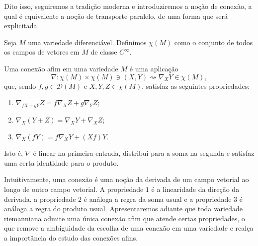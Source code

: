 Dito isso, seguiremos a tradição moderna e introduziremos a noção de conexão, a qual é equivalente a noção de transporte paralelo, de uma forma que será explicitada.
\begin{definition}
    \label{loc:2.1_:_def_1_:_conjunto_dos_campos_de_vetores}
    Seja $M$ uma variedade diferenciável. Definimos $\chi(M)$ como o conjunto de todos os campos de vetores em $M$ de classe $C^{\infty}$.
\end{definition}
\begin{definition}
    \label{loc:2.1_:_def_2_:_conexão_afim.definição}
    Uma conexão afim em uma variedade $M$ é uma aplicação
    \begin{equation*}
        \nabla:\chi(M)\times \chi(M) \ni (X, Y) \rightsquigarrow \nabla_{X}Y \in \chi(M),
    \end{equation*}
    que, sendo $f, g \in \mathcal{D}(M)$ e $X, Y, Z \in \chi(M)$, satisfaz as seguintes propriedades:
    \begin{enumerate}
        \item $\nabla_{fX+gY}Z=f\nabla_{X}Z + g\nabla_{Y}Z$;
        \item $\nabla_{X}(Y+Z)=\nabla _XY+\nabla_{X}Z$;
        \item $\nabla_{X}(fY)=f\nabla_{X}Y+(Xf)Y$.
    \end{enumerate}

    Isto é, $\nabla$ é linear na primeira entrada, distribui para a soma na segunda e satisfaz uma certa identidade para o produto.
\end{definition}
Intuitivamente, uma conexão é uma noção da derivada de um campo vetorial ao longo de outro campo vetorial. A propriedade $1$ é a linearidade da direção da derivada, a propriedade $2$ é análoga a regra da soma usual e a propriedade $3$ é análoga a regra do produto usual.  Apresentaremos adiante que toda variedade riemanniana admite uma única conexão afim que atende certas propriedades, o que remove a ambiguidade da escolha de uma conexão em uma variedade e realça a importância do estudo das conexões afins.

